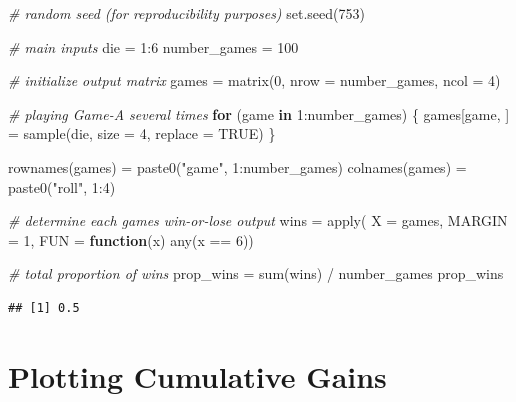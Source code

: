 \documentclass[
]{book}
\newenvironment{Shaded}{\begin{snugshade}}{\end{snugshade}}
\newcommand{\AttributeTok}[1]{\textcolor[rgb]{0.77,0.63,0.00}{#1}}
\newcommand{\CommentTok}[1]{\textcolor[rgb]{0.56,0.35,0.01}{\textit{#1}}}
\newcommand{\ConstantTok}[1]{\textcolor[rgb]{0.00,0.00,0.00}{#1}}
\newcommand{\ControlFlowTok}[1]{\textcolor[rgb]{0.13,0.29,0.53}{\textbf{#1}}}
\newcommand{\DecValTok}[1]{\textcolor[rgb]{0.00,0.00,0.81}{#1}}
\newcommand{\FunctionTok}[1]{\textcolor[rgb]{0.00,0.00,0.00}{#1}}
\newcommand{\NormalTok}[1]{#1}
\newcommand{\OtherTok}[1]{\textcolor[rgb]{0.56,0.35,0.01}{#1}}
\newcommand{\SpecialCharTok}[1]{\textcolor[rgb]{0.00,0.00,0.00}{#1}}
\newcommand{\StringTok}[1]{\textcolor[rgb]{0.31,0.60,0.02}{#1}}
\begin{document}
\begin{Shaded}
\begin{Highlighting}[]
\CommentTok{\# random seed (for reproducibility purposes)}
\FunctionTok{set.seed}\NormalTok{(}\DecValTok{753}\NormalTok{)}

\CommentTok{\# main inputs}
\NormalTok{die }\OtherTok{=} \DecValTok{1}\SpecialCharTok{:}\DecValTok{6}
\NormalTok{number\_games }\OtherTok{=} \DecValTok{100}

\CommentTok{\# initialize output matrix}
\NormalTok{games }\OtherTok{=} \FunctionTok{matrix}\NormalTok{(}\DecValTok{0}\NormalTok{, }\AttributeTok{nrow =}\NormalTok{ number\_games, }\AttributeTok{ncol =} \DecValTok{4}\NormalTok{)}

\CommentTok{\# playing Game{-}A several times}
\ControlFlowTok{for}\NormalTok{ (game }\ControlFlowTok{in} \DecValTok{1}\SpecialCharTok{:}\NormalTok{number\_games) \{}
\NormalTok{  games[game, ] }\OtherTok{=} \FunctionTok{sample}\NormalTok{(die, }\AttributeTok{size =} \DecValTok{4}\NormalTok{, }\AttributeTok{replace =} \ConstantTok{TRUE}\NormalTok{)}
\NormalTok{\}}

\FunctionTok{rownames}\NormalTok{(games) }\OtherTok{=} \FunctionTok{paste0}\NormalTok{(}\StringTok{"game"}\NormalTok{, }\DecValTok{1}\SpecialCharTok{:}\NormalTok{number\_games)}
\FunctionTok{colnames}\NormalTok{(games) }\OtherTok{=} \FunctionTok{paste0}\NormalTok{(}\StringTok{"roll"}\NormalTok{, }\DecValTok{1}\SpecialCharTok{:}\DecValTok{4}\NormalTok{)}

\CommentTok{\# determine each game\textquotesingle{}s win{-}or{-}lose output}
\NormalTok{wins }\OtherTok{=} \FunctionTok{apply}\NormalTok{(}
  \AttributeTok{X =}\NormalTok{ games, }
  \AttributeTok{MARGIN =} \DecValTok{1}\NormalTok{,}
  \AttributeTok{FUN =} \ControlFlowTok{function}\NormalTok{(x) }\FunctionTok{any}\NormalTok{(x }\SpecialCharTok{==} \DecValTok{6}\NormalTok{))}

\CommentTok{\# total proportion of wins}
\NormalTok{prop\_wins }\OtherTok{=} \FunctionTok{sum}\NormalTok{(wins) }\SpecialCharTok{/}\NormalTok{ number\_games}
\NormalTok{prop\_wins}
\end{Highlighting}
\end{Shaded}

\begin{verbatim}
## [1] 0.5
\end{verbatim}

\hypertarget{plotting-cumulative-gains}{%
\section{Plotting Cumulative Gains}\label{plotting-cumulative-gains}}
\end{document}
